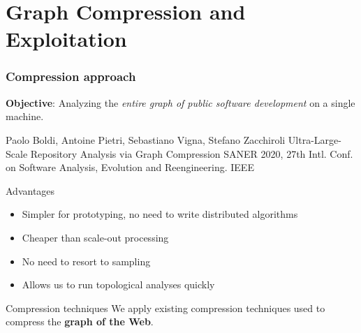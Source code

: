 \documentclass[aspectratio=169,xcolor=table]{beamer}
\begin{document}
    \section{Graph Compression and Exploitation}

    \begin{frame}
        \frametitle{Compression approach}

        \begin{block}{}
            \textbf{Objective}: Analyzing the \emph{entire graph of public
            software development} on a single machine.

            \footnotesize
            \begin{thebibliography}{swhgraphcomp}
                 Paolo Boldi, Antoine Pietri, Sebastiano Vigna, Stefano Zacchiroli
                \newblock Ultra-Large-Scale Repository Analysis via Graph Compression
                \newblock SANER 2020, 27th Intl. Conf. on Software Analysis, Evolution and Reengineering. IEEE
            \end{thebibliography}
        \end{block}

        \begin{block}{Advantages}
            \begin{itemize}
                \item Simpler for prototyping, no need to write distributed
                    algorithms
                \item Cheaper than scale-out processing
                \item No need to resort to sampling
                \item Allows us to run topological analyses quickly
            \end{itemize}
        \end{block}

        \begin{block}{Compression techniques}
            We apply existing compression techniques used to compress the
            \textbf{graph of the Web}.
        \end{block}
    \end{frame}
\end{document}
